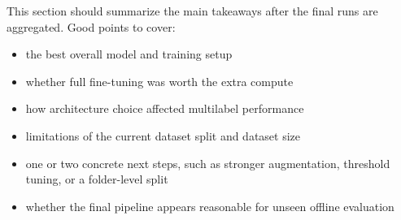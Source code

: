 \documentclass[10pt]{article}
\begin{document}
This section should summarize the main takeaways after the final runs are
aggregated. Good points to cover:

\begin{itemize}
    \item the best overall model and training setup
    \item whether full fine-tuning was worth the extra compute
    \item how architecture choice affected multilabel performance
    \item limitations of the current dataset split and dataset size
    \item one or two concrete next steps, such as stronger augmentation,
    threshold tuning, or a folder-level split
    \item whether the final pipeline appears reasonable for unseen offline evaluation
\end{itemize}




\end{document}
